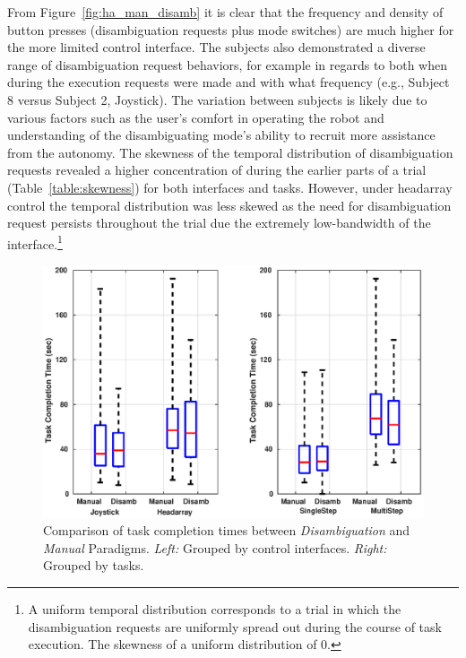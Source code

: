 \documentclass[journal]{IEEEtran}
\begin{document}
From Figure~\ref{fig:ha_man_disamb} it is clear that the frequency and density of button presses (disambiguation requests plus mode switches) are much higher for the more limited control interface. The subjects also demonstrated a diverse range of disambiguation request behaviors, for example in regards to both when during the execution requests were made and with what frequency (e.g., Subject 8 versus Subject 2, Joystick). The variation between subjects is likely due to various factors such as the user's comfort in operating the robot and understanding of the disambiguating mode's ability to recruit more assistance from the autonomy. The skewness of the temporal distribution of disambiguation requests revealed a higher concentration of during the earlier parts of a trial (Table~\ref{table:skewness}) for both interfaces and tasks. However, under headarray control the temporal distribution was less skewed as the need for disambiguation request persists throughout the trial due the extremely low-bandwidth of the interface.\footnote{A uniform temporal distribution corresponds to a trial in which the disambiguation requests are uniformly spread out during the course of task execution. The skewness of a uniform distribution of 0.}


\begin{figure}[h!]
	\centering
	\includegraphics[keepaspectratio, width = 1\hsize ,left]{./figures/task_completion.eps}
	\caption{Comparison of task completion times between \textit{Disambiguation} and \textit{Manual} Paradigms. \textit{Left:} Grouped by control interfaces. \textit{Right:} Grouped by tasks.}
	\label{fig:task_completion}
\end{figure}
\end{document}
